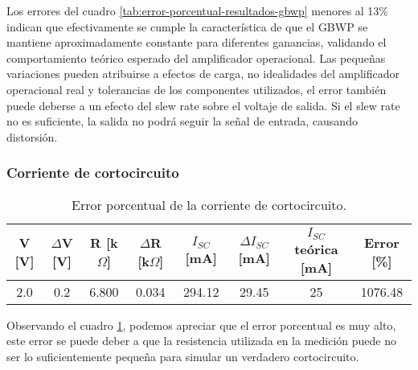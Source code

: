 Los errores del cuadro \ref{tab:error-porcentual-resultados-gbwp} menores al 13\% indican que efectivamente se cumple la característica de que el GBWP se mantiene aproximadamente constante para diferentes ganancias, validando el comportamiento teórico esperado del amplificador operacional. Las pequeñas variaciones pueden atribuirse a efectos de carga, no idealidades del amplificador operacional real y tolerancias de los componentes utilizados, el error también puede deberse a un efecto del slew rate sobre el voltaje de salida. Si el slew rate no es suficiente, la salida no podrá seguir la señal de entrada, causando distorsión.


\subsubsection{Corriente de cortocircuito}
\begin{table}[h!]
\centering
\begin{tabular}{|c|c|c|c|c|c|c|c|}
\hline
V [V] & $\Delta$V [V] & R [k$\Omega$] & $\Delta$R [k$\Omega$] & $I_{SC}$ [mA] & $\Delta I_{SC}$ [mA] & $I_{SC}$ teórica [mA] & Error [\%] \\ \hline
2.0 & 0.2 & 6.800 & 0.034 & 294.12 & 29.45 & 25 & 1076.48 \\ \hline
\end{tabular}
\caption{Error porcentual de la corriente de cortocircuito.}
\label{tab:error-porcentual-resultados-corriente-cortocircuito}
\end{table}

Observando el cuadro \ref{tab:error-porcentual-resultados-corriente-cortocircuito}, podemos apreciar que el error porcentual es muy alto, este error se puede deber a que la resistencia utilizada en la medición puede no ser lo suficientemente pequeña para simular un verdadero cortocircuito.

